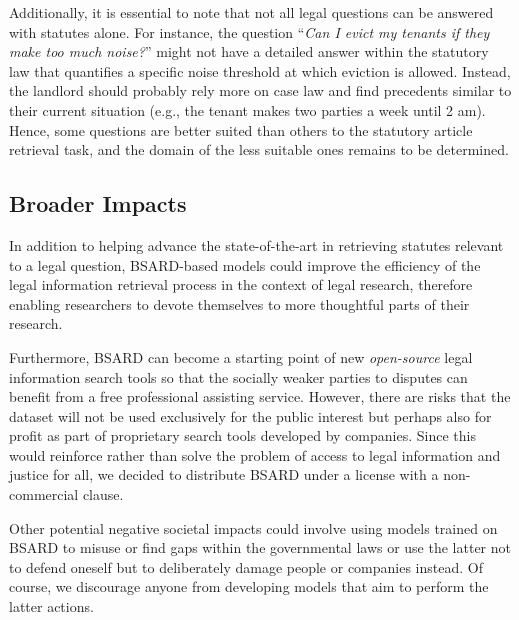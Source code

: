 \documentclass[11pt]{article}
\begin{document}
Additionally, it is essential to note that not all legal questions can be answered with statutes alone. For instance, the question “\textsl{Can I evict my tenants if they make too much noise?}” might not have a detailed answer within the statutory law that quantifies a specific noise threshold at which eviction is allowed. Instead, the landlord should probably rely more on case law and find precedents similar to their current situation (e.g., the tenant makes two parties a week until 2 am). Hence, some questions are better suited than others to the statutory article retrieval task, and the domain of the less suitable ones remains to be determined.

\subsection{Broader Impacts}
In addition to helping advance the state-of-the-art in retrieving statutes relevant to a legal question, BSARD-based models could improve the efficiency of the legal information retrieval process in the context of legal research, therefore enabling researchers to devote themselves to more thoughtful parts of their research.

Furthermore, BSARD can become a starting point of new \textit{open-source} legal information search tools so that the socially weaker parties to disputes can benefit from a free professional assisting service. However, there are risks that the dataset will not be used exclusively for the public interest but perhaps also for profit as part of proprietary search tools developed by companies. Since this would reinforce rather than solve the problem of access to legal information and justice for all, we decided to distribute BSARD under a license with a non-commercial clause.

Other potential negative societal impacts could involve using models trained on BSARD to misuse or find gaps within the governmental laws or use the latter not to defend oneself but to deliberately damage people or companies instead. Of course, we discourage anyone from developing models that aim to perform the latter actions.
\end{document}
